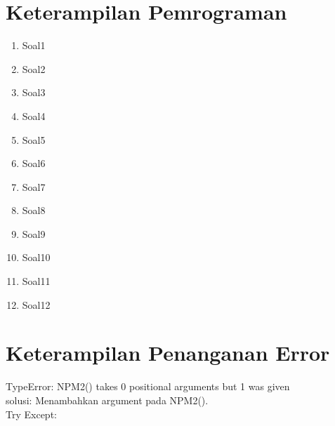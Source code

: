 \section{Keterampilan Pemrograman}

\begin{enumerate}
\item Soal1


\item Soal2


\item Soal3


\item Soal4


\item Soal5


\item Soal6


\item Soal7


\item Soal8


\item Soal9


\item Soal10


\item Soal11


\item Soal12


\end{enumerate}

\section{Keterampilan Penanganan Error}
TypeError: NPM2() takes 0 positional arguments but 1 was given \\
solusi: Menambahkan argument pada NPM2().\\


Try Except:







